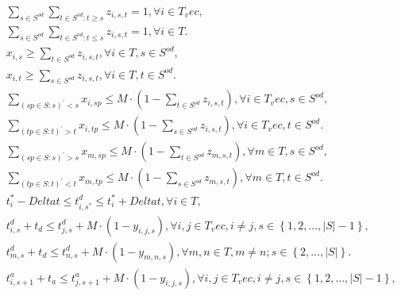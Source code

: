\begin{align}
  & \underset{s \in S^{\mathit{od}}}{\sum} \underset{t \in S^{\mathit{od}} : t \geq s}{\sum} z_{i , s , t} = 1 , \forall i \in T_vec , \tag{eq\_0001} \\
  & \underset{s \in S^{\mathit{od}}}{\sum} \underset{t \in S^{\mathit{od}} : t \leq s}{\sum} z_{i , s , t} = 1 , \forall i \in {T} . \tag{eq\_0002} \\
  & x_{i , s} \geq \underset{t \in S^{\mathit{od}}}{\sum} z_{i , s , t} , \forall i \in T , s \in S^{\mathit{od}} , \tag{eq\_0003} \\
  & x_{i , t} \geq \underset{s \in S^{\mathit{od}}}{\sum} z_{i , s , t} , \forall i \in T , t \in S^{\mathit{od}} . \tag{eq\_0004} \\
  & \sum_{\left(sp \in S : s\right)^{'} < s} x_{i , sp} \leq M \cdot \left(1 - \underset{t \in S^{\mathit{od}}}{\sum} z_{i , s , t}\right) , \forall i \in T_vec , s \in S^{\mathit{od}} , \tag{eq\_0005} \\
  & \sum_{\left(tp \in S : t\right)^{'} > t} x_{i , tp} \leq M \cdot \left(1 - \underset{s \in S^{\mathit{od}}}{\sum} z_{i , s , t}\right) , \forall i \in T_vec , t \in S^{\mathit{od}} . \tag{eq\_0006} \\
  & \sum_{\left(sp \in S : s\right)^{'} > s} x_{m , sp} \leq M \cdot \left(1 - \underset{t \in S^{\mathit{od}}}{\sum} z_{m , s , t}\right) , \forall m \in {T} , s \in S^{\mathit{od}} , \tag{eq\_0007} \\
  & \sum_{\left(tp \in S : t\right)^{'} < t} x_{m , tp} \leq M \cdot \left(1 - \underset{s \in S^{\mathit{od}}}{\sum} z_{m , s , t}\right) , \forall m \in {T} , t \in S^{\mathit{od}} . \tag{eq\_0008} \\
  & t_{i}^{*} - \mathit{Delta} t \leq t_{i , s^{*}}^{d} \leq t_{i}^{*} + \mathit{Delta} t , \forall i \in T , \tag{eq\_0009} \\
  & t_{i , s}^{d} + t_{d} \leq t_{j , s}^{d} + M \cdot \left(1 - y_{i , j , s}\right) , \forall i , j \in T_vec , i \neq j , s \in \left\{1 , 2 , \hdots , \left|S\right| - 1\right\} , \tag{eq\_0010} \\
  & t_{m , s}^{d} + t_{d} \leq t_{n , s}^{d} + M \cdot \left(1 - y_{m , n , s}\right) , \forall m , n \in {T} , m \neq n ; s \in \left\{2 , \hdots , \left|S\right|\right\} . \tag{eq\_0011} \\
  & t_{i , s + 1}^{a} + t_{a} \leq t_{j , s + 1}^{a} + M \cdot \left(1 - y_{i , j , s}\right) , \forall i , j \in T_vec , i \neq j , s \in \left\{1 , 2 , \hdots , \left|S\right| - 1\right\} , \tag{eq\_0012} \\

\end{align}
